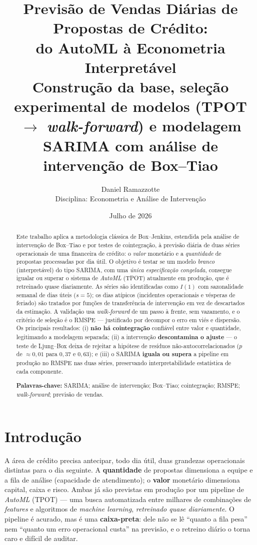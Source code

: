 \documentclass[11pt,a4paper]{article}
\title{\vspace{-1.2cm}\textbf{Previsão de Vendas Diárias de Propostas de Crédito:\\[3pt]
do AutoML à Econometria Interpretável}\\[6pt]
\large Construção da base, seleção experimental de modelos (TPOT $\rightarrow$ \emph{walk-forward})
e modelagem SARIMA com análise de intervenção de Box--Tiao}
\author{Daniel Ramazzotte\\[2pt]
\small Disciplina: Econometria e Análise de Intervenção}
\date{Julho de 2026}
\begin{document}
\maketitle

\begin{abstract}
\noindent
Este trabalho aplica a metodologia clássica de Box--Jenkins, estendida pela análise de
intervenção de Box--Tiao e por testes de cointegração, à previsão diária de duas séries
operacionais de uma financeira de crédito: o \emph{valor} monetário e a \emph{quantidade} de
propostas processadas por dia útil. O objetivo é testar se um modelo \emph{branco} (interpretável)
do tipo SARIMA, com uma \emph{única especificação congelada}, consegue igualar ou superar o
sistema de \emph{AutoML} (TPOT) atualmente em produção, que é retreinado quase diariamente. As
séries são identificadas como $I(1)$ com sazonalidade semanal de dias úteis ($s=5$);
os dias atípicos (incidentes operacionais e vésperas de feriado) são tratados por funções de
transferência de intervenção em vez de descartados da estimação. A validação usa
\emph{walk-forward} de um passo à frente, sem vazamento, e o critério de seleção é o RMSPE ---
justificado por decompor o erro em viés e dispersão. Os principais resultados: (i) \textbf{não há
cointegração} confiável entre valor e quantidade, legitimando a modelagem separada; (ii) a
intervenção \textbf{descontamina o ajuste} --- o teste de Ljung--Box deixa de rejeitar a hipótese
de resíduos não-autocorrelacionados ($p$ de $\approx 0{,}01$ para $0{,}37$ e $0{,}63$); e (iii) o
SARIMA \textbf{iguala ou supera} a pipeline em produção no RMSPE nas duas séries, preservando
interpretabilidade estatística de cada componente.

\vspace{4pt}
\noindent\textbf{Palavras-chave:} SARIMA; análise de intervenção; Box--Tiao; cointegração;
RMSPE; \emph{walk-forward}; previsão de vendas.
\end{abstract}

\section{Introdução}
\label{sec:intro}

A área de crédito precisa antecipar, todo dia útil, duas grandezas operacionais distintas para o
dia seguinte. A \textbf{quantidade} de propostas dimensiona a equipe e a fila de análise
(capacidade de atendimento); o \textbf{valor} monetário dimensiona capital, caixa e risco. Ambas
já são previstas em produção por um pipeline de \emph{AutoML} (TPOT) --- uma busca automatizada
entre milhares de combinações de \emph{features} e algoritmos de \emph{machine learning},
\emph{retreinado quase diariamente}. O pipeline é acurado, mas é uma \textbf{caixa-preta}: dele não
se lê ``quanto a fila pesa'' nem ``quanto um erro operacional custa'' na previsão, e o retreino
diário o torna caro e difícil de auditar.
\end{document}
